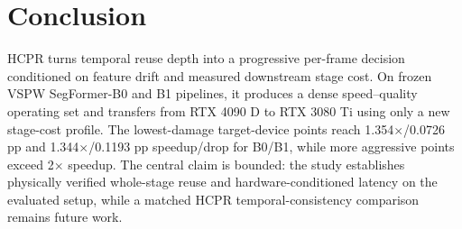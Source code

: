 \documentclass[runningheads]{llncs}
\begin{document}
\section{Conclusion}
HCPR turns temporal reuse depth into a progressive per-frame decision conditioned on feature drift and measured downstream stage cost. On frozen VSPW SegFormer-B0 and B1 pipelines, it produces a dense speed--quality operating set and transfers from RTX 4090 D to RTX 3080 Ti using only a new stage-cost profile. The lowest-damage target-device points reach 1.354$\times$/0.0726 pp and 1.344$\times$/0.1193 pp speedup/drop for B0/B1, while more aggressive points exceed 2$\times$ speedup. The central claim is bounded: the study establishes physically verified whole-stage reuse and hardware-conditioned latency on the evaluated setup, while a matched HCPR temporal-consistency comparison remains future work.



\end{document}
